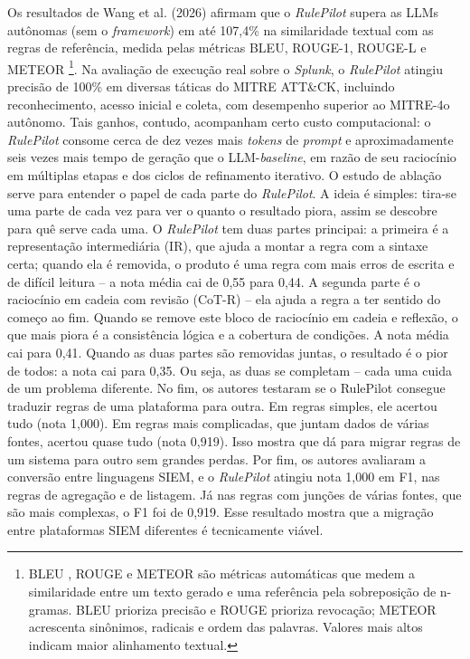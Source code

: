 Os resultados de Wang et al. (2026) afirmam que o \textit{RulePilot} supera as LLMs autônomas (sem o \textit{framework}) em até 107,4\% na similaridade textual com as regras de referência, medida pelas métricas BLEU, ROUGE-1, ROUGE-L e METEOR
\footnote{BLEU \cite{papineni2002bleu}, ROUGE \cite{in2004rouge} e METEOR \cite{banerjee2005meteor} são métricas automáticas que medem a similaridade entre um texto gerado e uma referência pela sobreposição de n-gramas. BLEU prioriza precisão e ROUGE prioriza revocação; METEOR acrescenta sinônimos, radicais e ordem das palavras. Valores mais altos indicam maior alinhamento textual.}. 
Na avaliação de execução real sobre o \textit{Splunk}, o \textit{RulePilot} atingiu precisão de 100\% em diversas táticas do \gls{MITRE} ATT&CK, incluindo reconhecimento, acesso inicial e coleta, com desempenho superior ao \gls{MITRE}-4o autônomo. 
Tais ganhos, contudo, acompanham certo custo computacional: o \textit{RulePilot} consome cerca de dez vezes mais \textit{tokens} de \textit{prompt} e aproximadamente seis vezes mais tempo de geração que o LLM-\textit{baseline}, em razão de seu raciocínio em múltiplas etapas e dos ciclos de refinamento iterativo. 
O estudo de ablação serve para entender o papel de cada parte do \textit{RulePilot}. 
A ideia é simples: tira-se uma parte de cada vez para ver o quanto o resultado piora, assim se descobre para quê serve cada uma.
O \textit{RulePilot} tem duas partes principai: a primeira é a representação intermediária (IR), que ajuda a montar a regra com a sintaxe certa; quando ela é removida, o produto é uma regra com mais erros de escrita e de difícil leitura -- a nota média cai de 0,55 para 0,44.
A segunda parte é o raciocínio em cadeia com revisão (CoT-R) -- ela ajuda a regra a ter sentido do começo ao fim. Quando se remove este bloco de raciocínio em cadeia e reflexão, o que mais piora é a consistência lógica e a cobertura de condições.  
A nota média cai para 0,41.
Quando as duas partes são removidas juntas, o resultado é o pior de todos: a nota cai para 0,35. 
Ou seja, as duas se completam -- cada uma cuida de um problema diferente.
No fim, os autores testaram se o RulePilot consegue traduzir regras de uma plataforma para outra. Em regras simples, ele acertou tudo (nota 1,000). Em regras mais complicadas, que juntam dados de várias fontes, acertou quase tudo (nota 0,919). Isso mostra que dá para migrar regras de um sistema para outro sem grandes perdas.
Por fim, os autores avaliaram a conversão entre linguagens SIEM, e o \textit{RulePilot} atingiu nota 1,000 em \gls{F1}, nas regras de agregação e de listagem. 
Já nas regras com junções de várias fontes, que são mais complexas, o \gls{F1} foi de 0,919. Esse resultado mostra que a migração entre plataformas \gls{SIEM} diferentes é tecnicamente viável.



